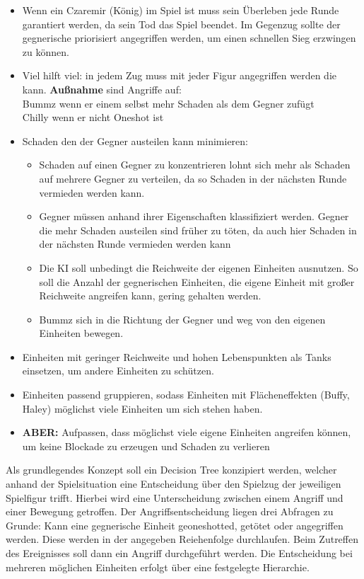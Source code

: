 \begin{itemize}
	\item Wenn ein Czaremir (König) im Spiel ist muss sein Überleben jede Runde garantiert werden, da sein Tod das Spiel beendet. Im Gegenzug sollte der gegnerische priorisiert angegriffen werden, um einen schnellen Sieg erzwingen zu können.
	\item Viel hilft viel: in jedem Zug muss mit jeder Figur angegriffen werden die kann. 
	\textbf{Außnahme} sind Angriffe auf:\\
	Bummz wenn er einem selbst mehr Schaden als dem Gegner zufügt\\
	Chilly wenn er nicht \glqq Oneshot\grqq{} ist
	\item Schaden den der Gegner austeilen kann minimieren:
	\begin{itemize}
		\item Schaden auf einen Gegner zu konzentrieren lohnt sich mehr als Schaden auf mehrere Gegner zu verteilen, da so Schaden in der nächsten Runde vermieden werden kann.
		\item Gegner müssen anhand ihrer Eigenschaften klassifiziert werden. Gegner die mehr Schaden austeilen sind früher zu töten, da auch hier Schaden in der nächsten Runde vermieden werden kann
		\item Die KI soll unbedingt die Reichweite der eigenen Einheiten ausnutzen. So soll die Anzahl der gegnerischen Einheiten, die eigene Einheit mit großer Reichweite angreifen kann, gering gehalten werden.
		\item Bummz sich in die Richtung der Gegner und weg von den eigenen Einheiten bewegen.
	\end{itemize}
	\item Einheiten mit geringer Reichweite und hohen Lebenspunkten als \glqq Tanks\grqq{} einsetzen, um andere Einheiten zu schützen.
	\item Einheiten passend gruppieren, sodass Einheiten mit Flächeneffekten (Buffy, Haley) möglichst viele Einheiten um sich stehen haben.
	\item \textbf{ABER:} Aufpassen, dass möglichst viele eigene Einheiten angreifen können, um keine Blockade zu erzeugen und Schaden zu \glqq verlieren\grqq{}
\end{itemize}

Als grundlegendes Konzept soll ein Decision Tree konzipiert werden, welcher anhand der Spielsituation eine Entscheidung über den Spielzug der jeweiligen Spielfigur trifft. Hierbei wird eine Unterscheidung zwischen einem Angriff und einer Bewegung getroffen. Der Angriffsentscheidung liegen drei Abfragen zu Grunde: Kann eine gegnerische Einheit \glqq geoneshotted\grqq{}, getötet oder angegriffen werden. Diese werden in der angegeben Reiehenfolge durchlaufen. Beim Zutreffen des Ereignisses soll dann ein Angriff durchgeführt werden. Die Entscheidung bei mehreren möglichen Einheiten erfolgt über eine festgelegte Hierarchie.

